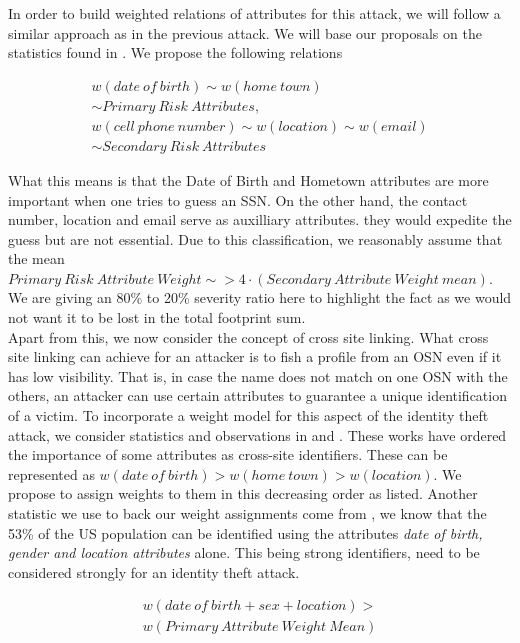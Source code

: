 \documentclass[10pt,conference]{IEEEtran}
\begin{document}
In order to build weighted relations of attributes for this attack, we will follow a similar approach as in the previous attack. We will base our proposals on the statistics found in \cite{facebook}. We propose the following relations

\begin{align*}
	w(date\ of\ birth) \sim w (home\ town) \\
	\sim Primary\ Risk\ Attributes , \\
	w(cell\ phone\ number) \sim w(location) \sim w(email) \\
	\sim Secondary\ Risk\ Attributes
\end{align*}

What this means is that the Date of Birth and Hometown attributes are more important when one tries to guess an SSN. On the other hand, the contact number, location and email serve as auxilliary attributes. they would expedite the guess but are not essential. Due to this classification, we reasonably assume that the mean $ Primary\ Risk\ Attribute\ Weight \sim>  4  \cdot   (Secondary\ Attribute\ Weight\ mean) $. We are giving an 80\% to 20\% severity ratio here to highlight the fact as we would not want it to be lost in the total footprint sum.\\

Apart from this, we now consider the concept of cross site linking. What cross site linking can achieve for an attacker is to fish a profile from an OSN even if it has low visibility. That is, in case the name does not match on one OSN with the others, an attacker can use certain attributes to guarantee a unique identification of a victim. To incorporate a weight model for this aspect of the identity theft attack, we consider statistics and observations in \cite{emergingthreat} and \cite{facebook}. These works have ordered the importance of some attributes as cross-site identifiers. These can be represented as $ w(date\ of\ birth) > w(home\ town) > w(location) $. We propose to assign weights to them in this decreasing order as listed. Another statistic we use to back our weight assignments come from \cite{leakage}, we know that the 53\% of the US population can be identified using the attributes \textit{date of birth, gender and location attributes} alone. This being strong identifiers, need to be considered strongly for an identity theft attack.

\begin{align*}
w(date\ of\ birth + sex + location) > \\
w(Primary\ Attribute\ Weight\ Mean)
\end{align*}
\end{document}
